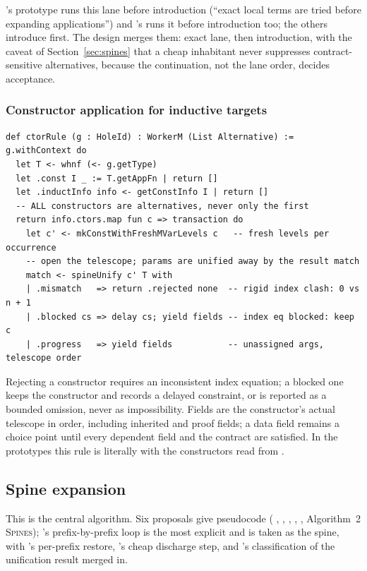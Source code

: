 's prototype runs this lane before introduction (``exact local terms are tried before expanding applications'') and 's runs it before introduction too; the others introduce first. The design merges them: exact lane, then introduction, with the caveat of Section~\ref{sec:spines} that a cheap inhabitant never suppresses contract-sensitive alternatives, because the continuation, not the lane order, decides acceptance.

\subsubsection{Constructor application for inductive targets}

\begin{lstlisting}
def ctorRule (g : HoleId) : WorkerM (List Alternative) := g.withContext do
  let T <- whnf (<- g.getType)
  let .const I _ := T.getAppFn | return []
  let .inductInfo info <- getConstInfo I | return []
  -- ALL constructors are alternatives, never only the first
  return info.ctors.map fun c => transaction do
    let c' <- mkConstWithFreshMVarLevels c   -- fresh levels per occurrence
    -- open the telescope; params are unified away by the result match
    match <- spineUnify c' T with
    | .mismatch   => return .rejected none  -- rigid index clash: 0 vs n + 1
    | .blocked cs => delay cs; yield fields -- index eq blocked: keep c
    | .progress   => yield fields           -- unassigned args, telescope order
\end{lstlisting}

Rejecting a constructor requires an inconsistent index equation; a blocked one keeps the constructor and records a delayed constraint, or is reported as a bounded omission, never as impossibility. Fields are the constructor's actual telescope in order, including inherited and proof fields; a data field remains a choice point until every dependent field and the contract are satisfied. In the prototypes this rule is literally  with the constructors read from .

\subsection{Spine expansion}\label{alg:spine}

This is the central algorithm. Six proposals give pseudocode ( ,  ,  ,  ,  ,  Algorithm~2 \textsc{Spines}); 's prefix-by-prefix loop is the most explicit and is taken as the spine, with 's per-prefix restore, 's cheap discharge step, and 's classification of the unification result merged in.

